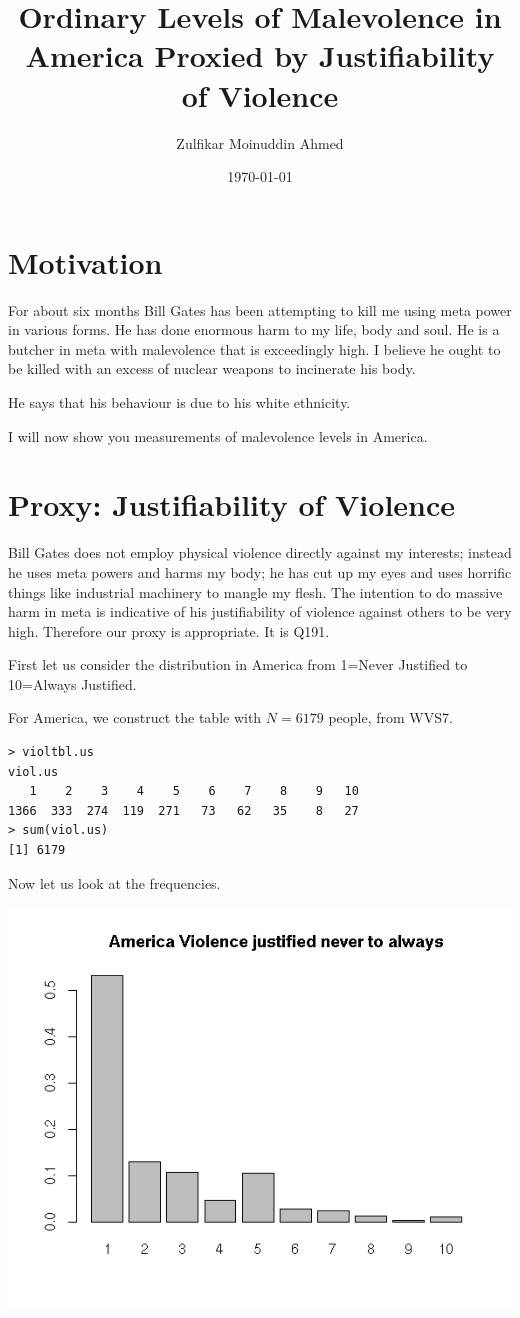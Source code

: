 \documentclass{amsart}
\title{Ordinary Levels of Malevolence in America Proxied by Justifiability of Violence}
\author{Zulfikar Moinuddin Ahmed}
\date{\today}
\begin{document}
\maketitle

\section{Motivation}

For about six months Bill Gates has been attempting to kill me using meta power in various forms.  He has done enormous harm to my life, body and soul.  He is a butcher in meta with malevolence that is exceedingly high.  I believe he ought to be killed with an excess of nuclear weapons to incinerate his body.  

He says that his behaviour is due to his white ethnicity.  

I will now show you measurements of malevolence levels in America.  

\section{Proxy: Justifiability of Violence}

Bill Gates does not employ physical violence directly against my interests; instead he uses meta powers and harms my body; he has cut up my eyes and uses horrific things like industrial machinery to mangle my flesh.  The intention to do massive harm in meta is indicative of his justifiability of violence against others to be very high.  Therefore our proxy is appropriate.  It is Q191.

First let us consider the distribution in America from 1=Never Justified to 10=Always Justified.

For America, we construct the table with $N=6179$ people, from WVS7.

\begin{verbatim}
> violtbl.us
viol.us
   1    2    3    4    5    6    7    8    9   10 
1366  333  274  119  271   73   62   35    8   27 
> sum(viol.us)
[1] 6179
\end{verbatim}

Now let us look at the frequencies.

\includegraphics[scale=0.8]{americaviol.jpeg}
\end{document}
